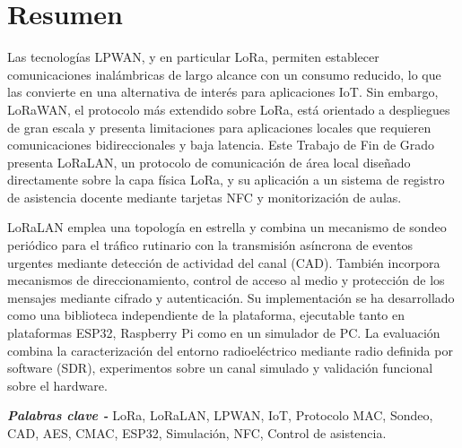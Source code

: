 \renewcommand{\keywords}{{\itshape \bfseries Palabras clave - }}
\chapter*{Resumen} 
Las tecnologías LPWAN, y en particular LoRa, permiten establecer comunicaciones inalámbricas de largo alcance con un consumo reducido, lo que las convierte en una alternativa de interés para aplicaciones IoT. Sin embargo, LoRaWAN, el protocolo más extendido sobre LoRa, está orientado a despliegues de gran escala y presenta limitaciones para aplicaciones locales que requieren comunicaciones bidireccionales y baja latencia. Este Trabajo de Fin de Grado presenta LoRaLAN, un protocolo de comunicación de área local diseñado directamente sobre la capa física LoRa, y su aplicación a un sistema de registro de asistencia docente mediante tarjetas NFC y monitorización de aulas.

LoRaLAN emplea una topología en estrella y combina un mecanismo de sondeo periódico para el tráfico rutinario con la transmisión asíncrona de eventos urgentes mediante detección de actividad del canal (CAD). También incorpora mecanismos de direccionamiento, control de acceso al medio y protección de los mensajes mediante cifrado y autenticación. Su implementación se ha desarrollado como una biblioteca independiente de la plataforma, ejecutable tanto en plataformas ESP32, Raspberry Pi como en un simulador de PC. La evaluación combina la caracterización del entorno radioeléctrico mediante radio definida por software (SDR), experimentos sobre un canal simulado y validación funcional sobre el hardware.


\keywords{LoRa, LoRaLAN, LPWAN, IoT, Protocolo MAC, Sondeo, CAD, AES, CMAC, ESP32, Simulación, NFC, Control de asistencia.}